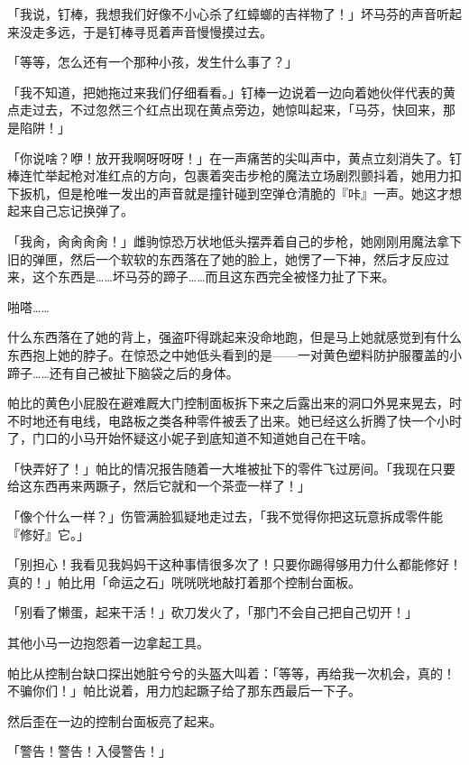 「我说，钉棒，我想我们好像不小心杀了红蟑螂的吉祥物了！」坏马芬的声音听起来没走多远，于是钉棒寻觅着声音慢慢摸过去。

「等等，怎么还有一个那种小孩，发生什么事了？」

「我不知道，把她拖过来我们仔细看看。」钉棒一边说着一边向着她伙伴代表的黄点走过去，不过忽然三个红点出现在黄点旁边，她惊叫起来，「马芬，快回来，那是陷阱！」

「你说啥？咿！放开我啊呀呀呀！」在一声痛苦的尖叫声中，黄点立刻消失了。钉棒连忙举起枪对准红点的方向，包裹着突击步枪的魔法立场剧烈颤抖着，她用力扣下扳机，但是枪唯一发出的声音就是撞针碰到空弹仓清脆的『咔』一声。她这才想起来自己忘记换弹了。

「我肏，肏肏肏肏！」雌驹惊恐万状地低头摆弄着自己的步枪，她刚刚用魔法拿下旧的弹匣，然后一个软软的东西落在了她的脸上，她愣了一下神，然后才反应过来，这个东西是……坏马芬的蹄子……而且这东西完全被怪力扯了下来。

啪嗒……{}

什么东西落在了她的背上，强盗吓得跳起来没命地跑，但是马上她就感觉到有什么东西抱上她的脖子。在惊恐之中她低头看到的是——一对黄色塑料防护服覆盖的小蹄子……还有自己被扯下脑袋之后的身体。

\horizonline


帕比的黄色小屁股在避难厩大门控制面板拆下来之后露出来的洞口外晃来晃去，时不时地还有电线，电路板之类各种零件被丢了出来。她已经这么折腾了快一个小时了，门口的小马开始怀疑这小妮子到底知道不知道她自己在干啥。

「快弄好了！」帕比的情况报告随着一大堆被扯下的零件飞过房间。「我现在只要给这东西再来两蹶子，然后它就和一个茶壶一样了！」

「像个什么一样？」伤管满脸狐疑地走过去，「我不觉得你把这玩意拆成零件能『修好』它。」

「别担心！我看见我妈妈干这种事情很多次了！只要你踢得够用力什么都能修好！真的！」帕比用「命运之石」咣咣咣地敲打着那个控制台面板。

「别看了懒蛋，起来干活！」砍刀发火了，「那门不会自己把自己切开！」

其他小马一边抱怨着一边拿起工具。

帕比从控制台缺口探出她脏兮兮的头盔大叫着：「等等，再给我一次机会，真的！不骗你们！」帕比说着，用力尥起蹶子给了那东西最后一下子。

然后歪在一边的控制台面板亮了起来。

「{\mtzh 警告！警告！入侵警告！}」

